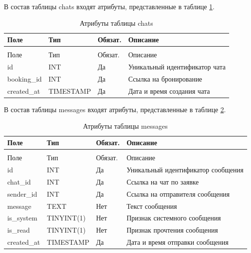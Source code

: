 В состав таблицы chats входят атрибуты, представленные в таблице \ref{chats:table}.

\begin{longtable}{|>{\raggedright\arraybackslash}p{3.8cm}|>{\raggedright\arraybackslash}p{3.8cm}|>{\centering\arraybackslash}p{2.0cm}|>{\raggedright\arraybackslash}p{5.4cm}|}
	\caption{Атрибуты таблицы chats}\label{chats:table} \\ \hline
	\centering Поле & \centering Тип & \centering Обязат. & \centering\arraybackslash Описание \\ \hline
	\endfirsthead
	\multicolumn{4}{l}{Продолжение таблицы \ref{chats:table}} \\ \hline
	\centering Поле & \centering Тип & \centering Обязат. & \centering\arraybackslash Описание \\ \hline
	\endhead
	id & INT & Да & Уникальный идентификатор чата \\ \hline
	booking\_id & INT & Да & Ссылка на бронирование \\ \hline
	created\_at & TIMESTAMP & Да & Дата и время создания чата \\ \hline
\end{longtable}

В состав таблицы messages входят атрибуты, представленные в таблице \ref{messages:table}.

\begin{longtable}{|>{\raggedright\arraybackslash}p{3.8cm}|>{\raggedright\arraybackslash}p{3.8cm}|>{\centering\arraybackslash}p{2.0cm}|>{\raggedright\arraybackslash}p{5.4cm}|}
	\caption{Атрибуты таблицы messages}\label{messages:table} \\ \hline
	\centering Поле & \centering Тип & \centering Обязат. & \centering\arraybackslash Описание \\ \hline
	\endfirsthead
	\multicolumn{4}{l}{Продолжение таблицы \ref{messages:table}} \\ \hline
	\centering Поле & \centering Тип & \centering Обязат. & \centering\arraybackslash Описание \\ \hline
	\endhead
	id & INT & Да & Уникальный идентификатор сообщения \\ \hline
	chat\_id & INT & Да & Ссылка на чат по заявке \\ \hline
	sender\_id & INT & Да & Ссылка на отправителя сообщения \\ \hline
	message & TEXT & Нет & Текст сообщения \\ \hline
	is\_system & TINYINT(1) & Нет & Признак системного сообщения \\ \hline
	is\_read & TINYINT(1) & Нет & Признак прочтения сообщения \\ \hline
	created\_at & TIMESTAMP & Да & Дата и время отправки сообщения \\ \hline
\end{longtable}


